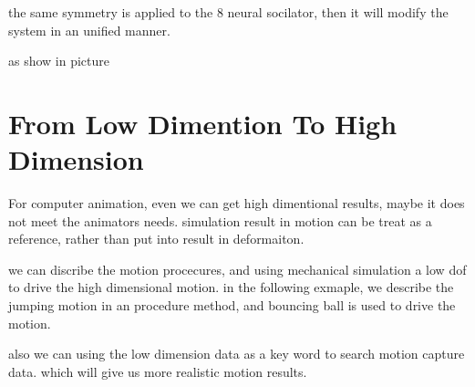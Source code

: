 the same symmetry is applied to the 8 neural socilator, then it will modify the system in an unified manner.

as show in picture



\section{From Low Dimention To High Dimension}

For computer animation, even we can get high dimentional results, maybe it does not meet the animators needs.
simulation result in motion can be treat as a reference, rather than put into result in deformaiton.

we can discribe the motion procecures, and using mechanical simulation a low dof to drive the high dimensional motion.
in the following exmaple,
we describe the jumping motion in an procedure method,
and bouncing ball is used to drive the motion.


also we can using the low dimension data as a key word to search motion capture data.
which will give us more realistic motion results.


